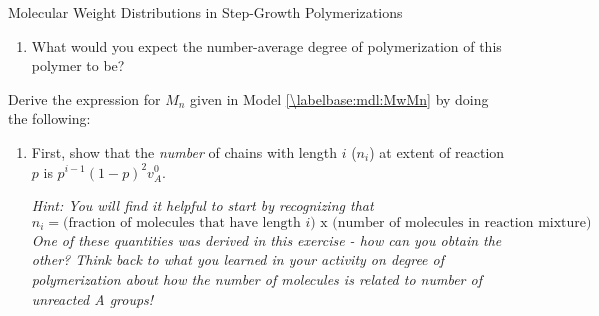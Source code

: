 \begin{activity}{Molecular Weight Distributions in Step-Growth Polymerizations}
\begin{exercises}
\begin{enumerate}
				\item What would you expect the number-average degree of polymerization of this polymer to be?
		
					\begin{solution}
					\end{solution}
			\end{enumerate}
			
		\exercise Derive the expression for $M_n$ given in Model \ref{\labelbase:mdl:MwMn} by doing the following: \label{labelbase:exc:MnMw}
		
			\begin{enumerate}
				\item First, show that the \emph{number} of chains with length $i$ ($n_i$) at extent of reaction $p$ is $p^{i-1}(1-p)^2v_A^0$.
				
					\emph{Hint: You will find it helpful to start by recognizing that}
					\begin{equation*}
						n_i = \text{(fraction of molecules that }\text{have length }i\text{) x (number of molecules in reaction mixture)}
					\end{equation*}
					\emph{One of these quantities was derived in this exercise - how can you obtain the other?  Think back to what you learned in your activity on degree of polymerization about how the number of molecules is related to number of unreacted A groups!}
					
					\begin{solution}
\end{solution}
\end{enumerate}
\end{exercises}
\end{activity}
